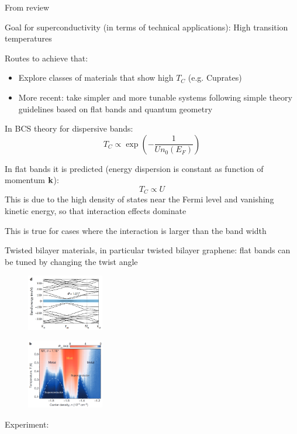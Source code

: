 \documentclass[aspectratio=169]{beamer}
\begin{document}
\begin{frame}
	From review \cite{tormaSuperconductivitySuperfluidityQuantum2022}
	
	Goal for superconductivity (in terms of technical applications): High transition temperatures
	
	Routes to achieve that:
	\begin{itemize}
		\item Explore classes of materials that show high \(T_C\) (e.g. Cuprates)
		\item More recent: take simpler and more tunable systems following simple theory guidelines based on flat bands and quantum geometry
	\end{itemize}
\end{frame}

\begin{frame}
	
	In BCS theory for dispersive bands:
	\begin{equation}
		T_C \propto \exp{(- \frac{1}{U n_0 (E_F)})}
	\end{equation}
			
	In flat bands it is predicted (energy dispersion is constant as function of momentum \(\mathbf{k}\)):
	\begin{equation}
		T_C \propto U
	\end{equation}
	This is due to the high density of states near the Fermi level and vanishing kinetic energy, so that interaction effects dominate
	
	This is true for cases where the interaction is larger than the band width
\end{frame}

\begin{frame}	
	Twisted bilayer materials, in particular twisted bilayer graphene: flat bands can be tuned by changing the twist angle
	
	\begin{figure}
		\includegraphics[width=0.3\textwidth]{figs/TBG band structure}
	\end{figure}

	\begin{figure}
		\includegraphics[width=0.3\textwidth]{figs/TBG SC experiment}
	\end{figure}
	
	Experiment: \cite{caoUnconventionalSuperconductivityMagicangle2018}
\end{frame}
\end{document}
